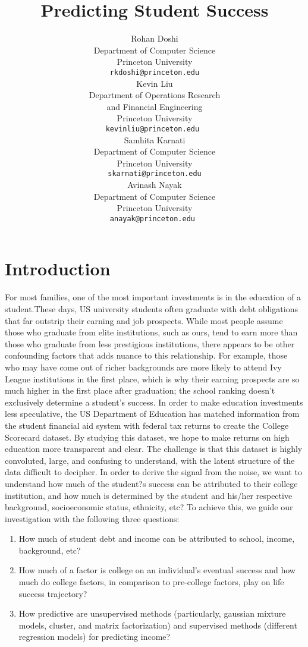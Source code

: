 \documentclass{article} %
\title{Predicting Student Success}
\author{
Rohan Doshi\\
Department of Computer Science\\
Princeton University\\
\texttt{rkdoshi@princeton.edu} \\
\And
Kevin Liu  \\
Department of Operations Research \\ and Financial Engineering \\
Princeton University\\
\texttt{kevinliu@princeton.edu } \\
\And
Samhita Karnati \\
Department of Computer Science\\
Princeton University\\
\texttt{skarnati@princeton.edu} \\
\And
Avinash Nayak  \\
Department of Computer Science\\
Princeton University\\
\texttt{anayak@princeton.edu } \\
}
\begin{document}
\maketitle

\section{Introduction}

For most families, one of the most important investments is in the education of a student.These days, US university students often graduate with debt obligations that far outstrip their earning and job prospects. While most people assume those who graduate from elite institutions, such as ours, tend to earn more than those who graduate from less prestigious institutions, there appears to be other confounding factors that adds nuance to this relationship. For example, those who may have come out of richer backgrounds are more likely to attend Ivy League institutions in the first place, which is why their earning prospects are so much higher in the first place after graduation; the school ranking doesn't exclusively determine a student's success. In order to make education investments less speculative, the US Department of Education has matched information from the student financial aid system with federal tax returns to create the College Scorecard dataset. By studying this dataset, we hope to make returns on high education more transparent and clear. The challenge is that this dataset is highly convoluted, large, and confusing to understand, with the latent structure of the data difficult to decipher. In order to derive the signal from the noise, we want to understand how much of the student?s success can be attributed to their college institution, and how much is determined by the student and his/her respective background, socioeconomic status, ethnicity, etc? To achieve this, we guide our investigation with the following three questions:
\begin{enumerate}
	\item How much of student debt and income can be attributed to school, income, background, etc?
	\item How much of a factor is college on an individual's eventual success and how much do college factors, in comparison to pre-college factors, play on life success trajectory?
	\item How predictive are unsupervised methods (particularly, gaussian mixture models, cluster, and matrix factorization) and supervised methods (different regression models) for predicting income?
\end{enumerate}
\end{document}
